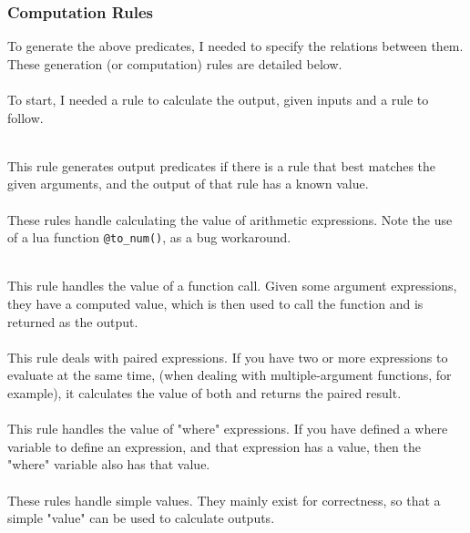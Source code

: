 
\subsubsection{Computation Rules}
To generate the above predicates, I needed to specify the relations between them. These generation (or computation) rules are detailed below. \\ \\
To start, I needed a rule to calculate the output, given inputs and a rule to follow.

 
\mbox{} \\
This rule generates output predicates if there is a rule that best matches the given arguments, and the output of that rule has a known value. \\


\mbox{} \\
These rules handle calculating the value of arithmetic expressions. Note the use of a lua function \lstinline{@to_num()}, as a bug workaround. %


\mbox{} \\
This rule handles the value of a function call. Given some argument expressions, they have a computed value, which is then used to call the function and is returned as the output. \\


\mbox{} \\
This rule deals with paired expressions. If you have two or more expressions to evaluate at the same time, (when dealing with multiple-argument functions, for example), it calculates the value of both and returns the paired result. \\


\mbox{} \\
This rule handles the value of "where" expressions. If you have defined a where variable to define an expression, and that expression has a value, then the "where" variable also has that value.\\


\mbox{} \\
These rules handle simple values. They mainly exist for correctness, so that a simple "value" can be used to calculate outputs. \\

